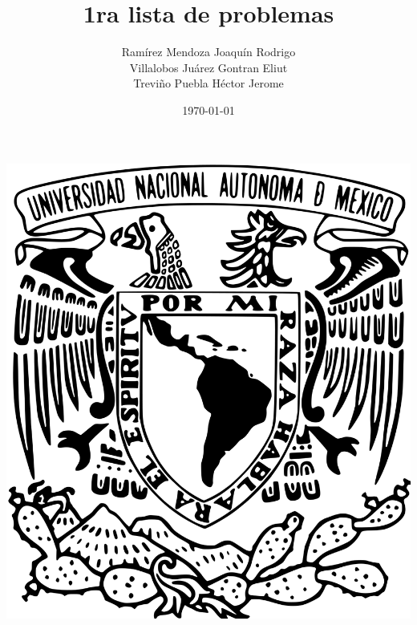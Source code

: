\documentclass{book}
\title{1ra lista de problemas}
\author{Ramírez Mendoza Joaquín Rodrigo\\
Villalobos Juárez Gontran Eliut\\
Treviño Puebla Héctor Jerome}
\date{\today}
\begin{document}
    \begin{titlepage}

    \begin{minipage}{3cm}
    	\begin{center}
    		\includegraphics[height = 0.14\textheight]{recursos/Logo_UNAM.png}\par
    	\end{center}
    \end{minipage}\hfill
    \begin{minipage}{10cm}
    	

\end{minipage}
\end{titlepage}
\end{document}

